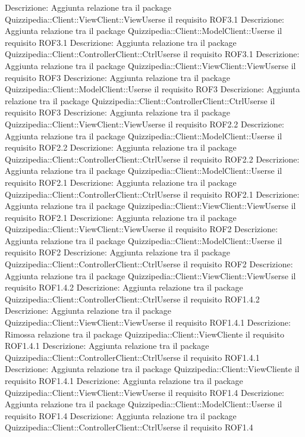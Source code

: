 Descrizione: Aggiunta relazione tra il package Quizzipedia::Client::ViewClient::ViewUserse il requisito ROF3.1 
Descrizione: Aggiunta relazione tra il package Quizzipedia::Client::ModelClient::Userse il requisito ROF3.1 
Descrizione: Aggiunta relazione tra il package Quizzipedia::Client::ControllerClient::CtrlUserse il requisito ROF3.1 
Descrizione: Aggiunta relazione tra il package Quizzipedia::Client::ViewClient::ViewUserse il requisito ROF3 
Descrizione: Aggiunta relazione tra il package Quizzipedia::Client::ModelClient::Userse il requisito ROF3 
Descrizione: Aggiunta relazione tra il package Quizzipedia::Client::ControllerClient::CtrlUserse il requisito ROF3 
Descrizione: Aggiunta relazione tra il package Quizzipedia::Client::ViewClient::ViewUserse il requisito ROF2.2 
Descrizione: Aggiunta relazione tra il package Quizzipedia::Client::ModelClient::Userse il requisito ROF2.2 
Descrizione: Aggiunta relazione tra il package Quizzipedia::Client::ControllerClient::CtrlUserse il requisito ROF2.2 
Descrizione: Aggiunta relazione tra il package Quizzipedia::Client::ModelClient::Userse il requisito ROF2.1 
Descrizione: Aggiunta relazione tra il package Quizzipedia::Client::ControllerClient::CtrlUserse il requisito ROF2.1 
Descrizione: Aggiunta relazione tra il package Quizzipedia::Client::ViewClient::ViewUserse il requisito ROF2.1 
Descrizione: Aggiunta relazione tra il package Quizzipedia::Client::ViewClient::ViewUserse il requisito ROF2 
Descrizione: Aggiunta relazione tra il package Quizzipedia::Client::ModelClient::Userse il requisito ROF2 
Descrizione: Aggiunta relazione tra il package Quizzipedia::Client::ControllerClient::CtrlUserse il requisito ROF2 
Descrizione: Aggiunta relazione tra il package Quizzipedia::Client::ViewClient::ViewUserse il requisito ROF1.4.2 
Descrizione: Aggiunta relazione tra il package Quizzipedia::Client::ControllerClient::CtrlUserse il requisito ROF1.4.2 
Descrizione: Aggiunta relazione tra il package Quizzipedia::Client::ViewClient::ViewUserse il requisito ROF1.4.1 
Descrizione: Rimossa relazione tra il package Quizzipedia::Client::ViewCliente il requisito ROF1.4.1 
Descrizione: Aggiunta relazione tra il package Quizzipedia::Client::ControllerClient::CtrlUserse il requisito ROF1.4.1 
Descrizione: Aggiunta relazione tra il package Quizzipedia::Client::ViewCliente il requisito ROF1.4.1 
Descrizione: Aggiunta relazione tra il package Quizzipedia::Client::ViewClient::ViewUserse il requisito ROF1.4 
Descrizione: Aggiunta relazione tra il package Quizzipedia::Client::ModelClient::Userse il requisito ROF1.4 
Descrizione: Aggiunta relazione tra il package Quizzipedia::Client::ControllerClient::CtrlUserse il requisito ROF1.4 
